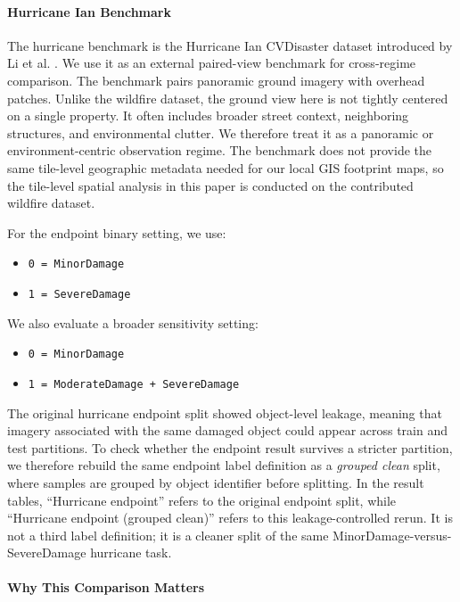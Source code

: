 \documentclass[sigconf]{acmart}
\begin{document}
\paragraph{Hurricane Ian Benchmark}

The hurricane benchmark is the Hurricane Ian CVDisaster dataset introduced by
Li et al. \cite{li2025cross}. We use it as an external paired-view benchmark
for cross-regime comparison. The benchmark pairs panoramic ground imagery with
overhead patches. Unlike the wildfire dataset, the ground view here is not
tightly centered on a single property. It often includes broader street
context, neighboring structures, and environmental clutter. We therefore treat
it as a panoramic or environment-centric observation regime. The benchmark does
not provide the same tile-level geographic metadata needed for our local GIS
footprint maps, so the tile-level spatial analysis in this paper is conducted
on the contributed wildfire dataset.

For the endpoint binary setting, we use:
\begin{itemize}
  \item \texttt{0 = MinorDamage}
  \item \texttt{1 = SevereDamage}
\end{itemize}

We also evaluate a broader sensitivity setting:
\begin{itemize}
  \item \texttt{0 = MinorDamage}
  \item \texttt{1 = ModerateDamage + SevereDamage}
\end{itemize}

The original hurricane endpoint split showed object-level leakage, meaning that
imagery associated with the same damaged object could appear across train and
test partitions. To check whether the endpoint result survives a stricter
partition, we therefore rebuild the same endpoint label definition as a
\emph{grouped clean} split, where samples are grouped by object identifier
before splitting. In the result tables, ``Hurricane endpoint'' refers to the
original endpoint split, while ``Hurricane endpoint (grouped clean)'' refers to
this leakage-controlled rerun. It is not a third label definition; it is a
cleaner split of the same MinorDamage-versus-SevereDamage hurricane task.

\paragraph{Why This Comparison Matters}
\end{document}
